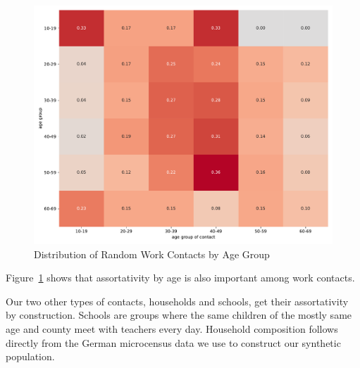 \begin{figure}[ht]
    \centering
    \includegraphics[width=0.9 \textwidth]{figures/results/figures/data/assortativity_work_non_recurrent}
    \caption{Distribution of Random Work Contacts by Age Group}
    \label{fig:assortativity_work}
\end{figure}

Figure~\ref{fig:assortativity_work} shows that assortativity by age is also important
among work contacts.

Our two other types of contacts, households and schools, get their assortativity by
construction. Schools are groups where the same children of the mostly same age and
county meet with teachers every day. Household composition follows directly from the
German microcensus data we use to construct our synthetic population.

\FloatBarrier
